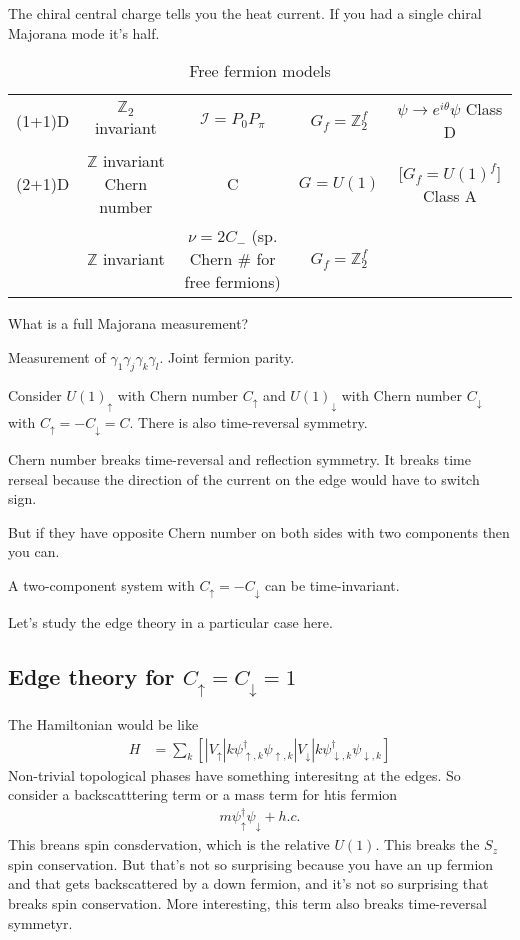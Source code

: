 \section{}
The chiral central charge tells you the heat current.
If you had a single chiral Majorana mode it's half.

\begin{table}
    \centering
    \begin{tabular}{ccccc}
        (1+1)D & $\mathbb{Z}_2$ invariant &
        $\mathcal{I}=P_0 P_\pi$ &
        $G_f = \mathbb{Z}_2^f$ &
        $\psi\to e^{i\theta}\psi$ Class D\\
        (2+1)D & $\mathbb{Z}$ invariant Chern number &
        C &
        $G=U(1)$ &
        [$G_f=U(1)^f$] Class A\\
        & $\mathbb{Z}$ invariant &
        $\nu=2C_{-}$ (sp. Chern # for free fermions) &
        $G_f=\mathbb{Z}_2^f$
    \end{tabular}
    \caption{Free fermion models}
    \label{tab:freefermions}
\end{table}

\begin{question}
    What is a full Majorana measurement?
\end{question}
Measurement of $\gamma_1 \gamma_j \gamma_k \gamma_l$.
Joint fermion parity.


Consider $U(1)_\uparrow$ with Chern number $C_\uparrow$
and $U(1)_\downarrow$ with Chern number $C_\downarrow$
with
$C_{\uparrow} = -C_{\downarrow} = C$.
There is also time-reversal symmetry.

Chern number breaks time-reversal and reflection symmetry.
It breaks time rerseal because the direction of the current on the edge would
have to switch sign.

But if they have opposite Chern number on both sides with two components then
you can.

A two-component system with $C_\uparrow = -C_\downarrow$ can be time-invariant.

Let's study the edge theory in a particular case here.

\subsection{Edge theory for $C_\uparrow=C_\downarrow=1$}
The Hamiltonian would be like
\begin{align}
    H &=
    \sum_k \left[ 
    |V_\uparrow| k \psi_{\uparrow,k}^\dagger \psi_{\uparrow,k}
    |V_\downarrow| k \psi_{\downarrow,k}^\dagger \psi_{\downarrow,k}
    \right]
\end{align}
Non-trivial topological phases have something interesitng at the edges.
So consider a backscatttering term or a mass term for htis fermion
\begin{align}
    m \psi_\uparrow^\dagger \psi_\downarrow + h.c.
\end{align}
This breans spin consdervation,
which is the relative $U(1)$.
This breaks the $S_z$ spin conservation.
But that's not so surprising because you have an up fermion and that gets
backscattered by a down fermion,
and it's not so surprising that breaks spin conservation.
More interesting,
this term also breaks time-reversal symmetyr.

